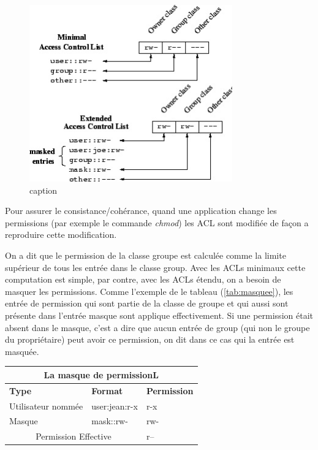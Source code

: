 \begin{figure}[htbp]
\centering
\includegraphics[height=3in]{img/acl-mapping.jpg}
\caption{caption}
\label{fig:img_acl-mapping}
\end{figure}
 
 
Pour assurer le consistance/cohérance, quand une application change les permissions (par exemple le commande \emph{chmod}) les ACL sont modifiée de façon a reproduire cette modification.
 
On a dit que le permission de la classe groupe est calculée comme la limite supérieur de tous les entrée dans le classe group. Avec les ACLs minimaux cette computation est simple, par contre, avec les ACLs étendu, on a besoin de masquer les permissions. Comme l'exemple de le tableau (\ref{tab:masquee}), les entrée de permission qui sont partie de la classe de groupe et qui aussi sont présente dans l'entrée masque sont applique effectivement. Si une permission était absent dans le masque, c'est a dire que aucun entrée de group (qui non le groupe du propriétaire) peut avoir ce permission, on dit dans ce cas qui la entrée est masquée.
 
\begin{center}
\begin{tabular}{|l|l|l|}
  \hline
    \multicolumn{3}{|c|}{La masque de permissionL} \\
  \hline
\textbf{Type} & \textbf{Format} & \textbf{Permission} \\
  \hline
Utilisateur nommée & user:jean:r-x & r-x\\
  \hline
Masque & mask::rw- & rw-\\
  \hline
\multicolumn{2}{|c|}{Permission Effective} & r--\\
  \hline
\end{tabular}
\label{tab:masque}
\end{center}
 
